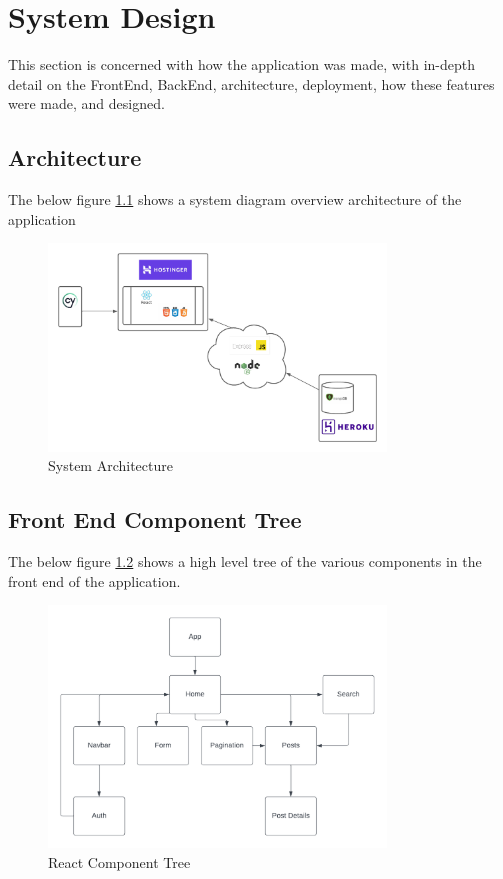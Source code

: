 \chapter{System Design}
This section is concerned with how the application was made, with in-depth detail on the FrontEnd, BackEnd, architecture, deployment, how these features were made, and designed.

\section{Architecture}
The below figure \ref{image:Architecture} shows a system diagram overview architecture of the application
\begin{figure}[h!]
    \centering
    \includegraphics[width=0.8\textwidth]{images/SystemDiagram.png}
    \caption{System Architecture}
    \label{image:Architecture}
\end{figure}

\section{Front End Component Tree }
The below figure \ref{image:ReactTree} shows a high level tree of the various components in the front end of the application.
\begin{figure}[h!]
    \centering
    \includegraphics[width=0.8\textwidth]{images/ReactCompTree.png}
    \caption{React Component Tree}
    \label{image:ReactTree}
\end{figure}

